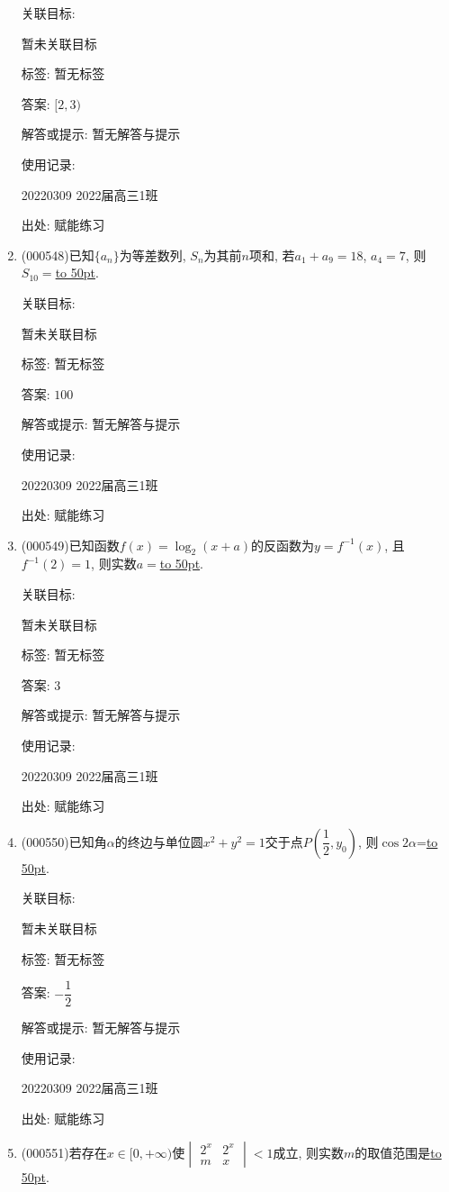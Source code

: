 \documentclass[10pt,a4paper]{article}
\newcommand{\blank}[1]{\underline{\hbox to #1pt{}}}
\begin{document}
\begin{enumerate}[1.]
关联目标:

暂未关联目标



标签: 暂无标签

答案: $[2,3)$

解答或提示: 暂无解答与提示

使用记录:

20220309	2022届高三1班	


出处: 赋能练习
\item { (000548)}已知$\{a_n\}$为等差数列, $S_n$为其前$n$项和, 若$a_1+a_9=18$, $a_4=7 $, 则$S_{10}=$\blank{50}.


关联目标:

暂未关联目标



标签: 暂无标签

答案: $100$

解答或提示: 暂无解答与提示

使用记录:

20220309	2022届高三1班	


出处: 赋能练习
\item { (000549)}已知函数$f(x)=\log_2(x+a)$的反函数为$y=f^{-1}(x)$, 且$f^{-1}(2)=1$, 则实数$a=$\blank{50}.


关联目标:

暂未关联目标



标签: 暂无标签

答案: $3$

解答或提示: 暂无解答与提示

使用记录:

20220309	2022届高三1班	


出处: 赋能练习
\item { (000550)}已知角$\alpha$的终边与单位圆$x^2+y^2=1$交于点$P(\dfrac12,y_0)$, 则$\cos 2 \alpha$=\blank{50}.


关联目标:

暂未关联目标



标签: 暂无标签

答案: $-\dfrac 12$

解答或提示: 暂无解答与提示

使用记录:

20220309	2022届高三1班	


出处: 赋能练习
\item { (000551)}若存在$x\in [0,+\infty)$使$\begin{vmatrix}2^x & 2^x \\ m & x \end{vmatrix}<1$成立, 则实数$m$的取值范围是\blank{50}.



\end{enumerate}
\end{document}
